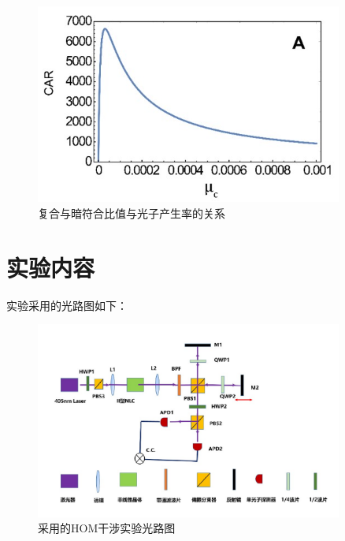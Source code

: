 \documentclass[a4paper,UTF8]{ctexart}
\begin{document}
\begin{figure}[H]
    \centering
    \begin{minipage}[b]{0.9\textwidth}
        \centering
        \includegraphics[width=0.9\textwidth]{./fig4.jpg}
        \caption{复合与暗符合比值与光子产生率的关系}
    \end{minipage}
\end{figure}

\section{实验内容}

实验采用的光路图如下：

\begin{figure}[H]
    \centering
    \begin{minipage}[b]{0.9\textwidth}
        \centering
        \includegraphics[width=0.9\textwidth]{./fig1.jpg}
        \caption{采用的HOM干涉实验光路图}
    \end{minipage}
\end{figure}
\end{document}
